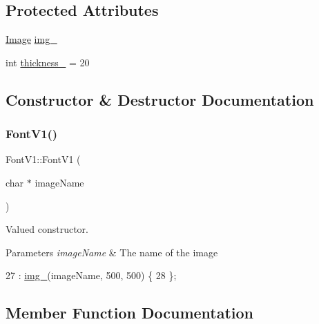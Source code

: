 \subsection*{Protected Attributes}
\begin{DoxyCompactItemize}
\item 
\mbox{\hyperlink{class_image}{Image}} \mbox{\hyperlink{class_font_v1_a00569e3e3c4b70f437b63f396f735fb0}{img\+\_\+}}
\item 
int \mbox{\hyperlink{class_font_v1_aed8040e76be9a52833627b92f0fb4e5f}{thickness\+\_\+}} = 20
\end{DoxyCompactItemize}


\subsection{Constructor \& Destructor Documentation}
\mbox{\label{class_font_v1_ada1ed699d42679f81146af4bc20db006}} 
\subsubsection{\texorpdfstring{Font\+V1()}{FontV1()}}
{\footnotesize\ttfamily Font\+V1\+::\+Font\+V1 (\begin{DoxyParamCaption}\item[{char $\ast$}]{image\+Name }\end{DoxyParamCaption})\hspace{0.3cm}{\ttfamily [inline]}}



Valued constructor. 


\begin{DoxyParams}{Parameters}
{\em image\+Name} & The name of the image \\
\hline
\end{DoxyParams}

\begin{DoxyCode}
27                                 : \mbox{\hyperlink{class_font_v1_a00569e3e3c4b70f437b63f396f735fb0}{img\_}}(imageName, 500, 500) \{
28         \};
\end{DoxyCode}


\subsection{Member Function Documentation}
\mbox{\label{class_font_v1_a29afd2079bc41cdec9d3de6bb4e1be52}} 
